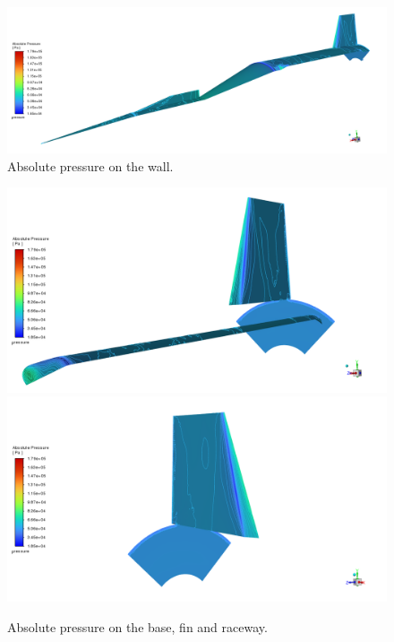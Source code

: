 \documentclass[12pt]{article}
\begin{document}
\begin{figure}[H]
    \centering
    \includegraphics[width=\linewidth]{figs/t39s/t39s_M0p73_Pabs_wall.png}
    \caption{Absolute pressure on the wall.}
    \label{fig:t39s_pabs}
\end{figure}
\begin{figure}[H]
    \centering
    \includegraphics[width=0.495\linewidth]{figs/t39s/t39s_M0p73_Pabs_base_fin_raceway.png}
    \includegraphics[width=0.495\linewidth]{figs/t39s/t39s_M0p73_Pabs_base_fin.png}
    \caption{Absolute pressure on the base, fin and raceway.}
    \label{fig:t39s_base_fin_raceway_pabs}
\end{figure}
\end{document}
